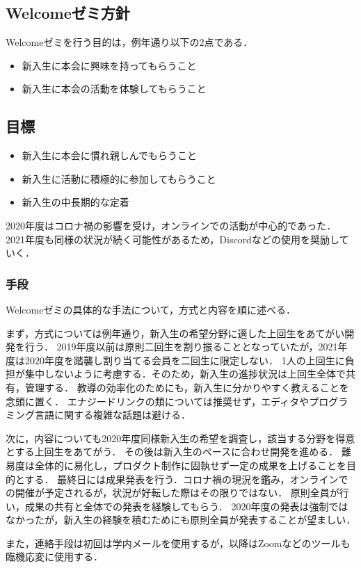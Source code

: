 \subsection*{Welcomeゼミ方針}


Welcomeゼミを行う目的は，例年通り以下の2点である．

\begin{itemize}
    \item 新入生に本会に興味を持ってもらうこと
    \item 新入生に本会の活動を体験してもらうこと
\end{itemize}

\subsection*{目標}
\begin{itemize}
    \item 新入生に本会に慣れ親しんでもらうこと
    \item 新入生に活動に積極的に参加してもらうこと
    \item 新入生の中長期的な定着
\end{itemize}

2020年度はコロナ禍の影響を受け，オンラインでの活動が中心的であった．
2021年度も同様の状況が続く可能性があるため，Discordなどの使用を奨励していく．

\subsubsection*{手段}
Welcomeゼミの具体的な手法について，方式と内容を順に述べる．

まず，方式については例年通り，新入生の希望分野に適した上回生をあてがい開発を行う．
2019年度以前は原則二回生を割り振ることとなっていたが，2021年度は2020年度を踏襲し割り当てる会員を二回生に限定しない．
1人の上回生に負担が集中しないように考慮する．そのため，新入生の進捗状況は上回生全体で共有，管理する．
教導の効率化のためにも，新入生に分かりやすく教えることを念頭に置く．
エナジードリンクの類については推奨せず，エディタやプログラミング言語に関する複雑な話題は避ける．

次に，内容についても2020年度同様新入生の希望を調査し，該当する分野を得意とする上回生をあてがう．
その後は新入生のペースに合わせ開発を進める．
難易度は全体的に易化し，プロダクト制作に固執せず一定の成果を上げることを目的とする．
最終日には成果発表を行う．コロナ禍の現況を鑑み，オンラインでの開催が予定されるが，状況が好転した際はその限りではない．
原則全員が行い，成果の共有と全体での発表を経験してもらう．
2020年度の発表は強制ではなかったが，新入生の経験を積むためにも原則全員が発表することが望ましい．

また，連絡手段は初回は学内メールを使用するが，以降はZoomなどのツールも臨機応変に使用する．
